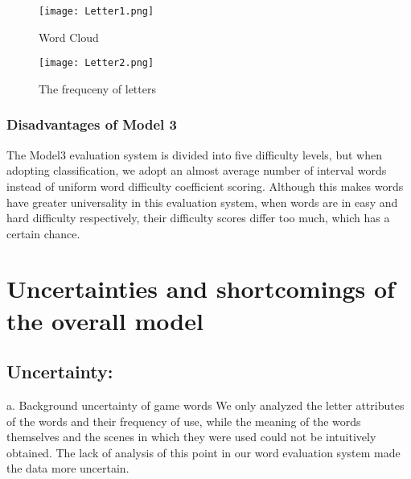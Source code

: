 \documentclass[12pt]{article}  %
\begin{document}
\begin{figure}[htbp]
	\centering
	\texttt{[image: Letter1.png]}
	\caption{Word Cloud }\label{fig:result}
\end{figure}

\begin{figure}[htbp]
	\centering
	\texttt{[image: Letter2.png]}
	\caption{The frequceny of letters}\label{fig:result}
\end{figure}











\subsubsection{Disadvantages of Model 3}

The Model3 evaluation system is divided into five difficulty levels, but when adopting classification, we adopt an almost average number of interval words instead of uniform word difficulty coefficient scoring. Although this makes words have greater universality in this evaluation system, when words are in easy and hard difficulty respectively, their difficulty scores differ too much, which has a certain chance.

\section{Uncertainties and shortcomings of the overall model}

\subsection{Uncertainty:}
a. Background uncertainty of game words
We only analyzed the letter attributes of the words and their frequency of use, while the meaning of the words themselves and the scenes in which they were used could not be intuitively obtained. The lack of analysis of this point in our word evaluation system made the data more uncertain.
\end{document}

